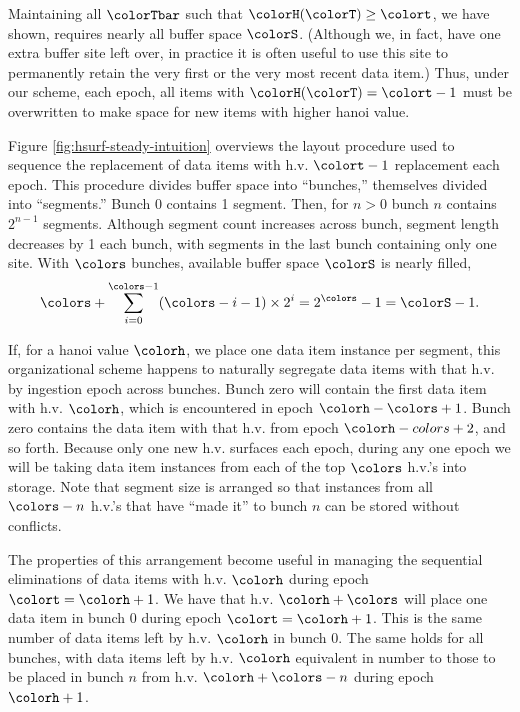

Maintaining all $\colorTbar$ such that $\colorH(\colorT) \geq \colort$, we have shown, requires nearly all buffer space $\colorS$.
(Although we, in fact, have one extra buffer site left over, in practice it is often useful to use this site to permanently retain the very first or the very most recent data item.)
Thus, under our scheme, each epoch, all items with $\colorH(\colorT) = \colort - 1$ must be overwritten to make space for new items with higher hanoi value.

Figure \ref{fig:hsurf-steady-intuition} overviews the layout procedure used to sequence the replacement of data items with h.v. $\colort - 1$ replacement each epoch.
This procedure divides buffer space into ``bunches,'' themselves divided into ``segments.''
Bunch 0 contains 1 segment.
Then, for $n > 0$ bunch $n$ contains $2^{n-1}$ segments.
Although segment count increases across bunch, segment length decreases by 1 each bunch, with segments in the last bunch containing only one site.
With $\colors$ bunches, available buffer space $\colorS$ is nearly filled,
\begin{align*}
\colors + \sum_{i=0}^{\colors-1} (\colors - i - 1) \times 2^{i} = 2^{\colors} - 1 = \colorS - 1.
\end{align*}

If, for a hanoi value $\colorh$, we place one data item instance per segment, this organizational scheme happens to naturally segregate data items with that h.v. by ingestion epoch across bunches.
Bunch zero will contain the first data item with h.v. $\colorh$, which is encountered in epoch $\colorh - \colors + 1$.
Bunch zero contains the data item with that h.v. from epoch $\colorh - colors + 2$, and so forth.
Because only one new h.v. surfaces each epoch, during any one epoch we will be taking data item instances from each of the top $\colors$ h.v.'s into storage.
Note that segment size is arranged so that instances from all $\colors - n$ h.v.'s that have ``made it'' to bunch $n$ can be stored without conflicts.



The properties of this arrangement become useful in managing the sequential eliminations of data items with h.v. $\colorh$ during epoch $\colort=\colorh + 1$.
We have that h.v. $\colorh + \colors$ will place one data item in bunch 0 during epoch $\colort=\colorh + 1$.
This is the same number of data items left by h.v. $\colorh$ in bunch 0.
The same holds for all bunches, with data items left by h.v. $\colorh$ equivalent in number to those to be placed in bunch $n$ from h.v. $\colorh + \colors - n$ during epoch $\colorh + 1$.

